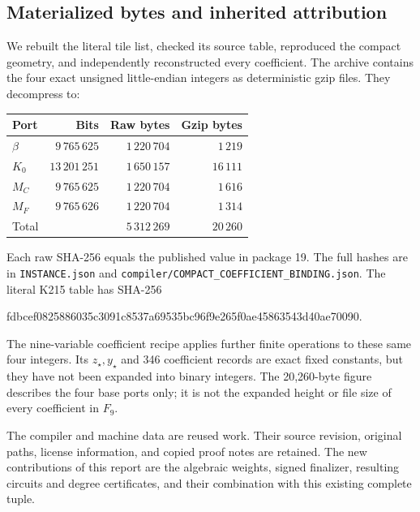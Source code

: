 \subsection{Materialized bytes and inherited attribution}
We rebuilt the literal tile list, checked its source table, reproduced the
compact geometry, and independently reconstructed every coefficient. The
archive contains the four exact unsigned little-endian integers as
deterministic gzip files. They decompress to:
\begin{center}
\begin{tabular}{lrrr}
\toprule
Port & Bits & Raw bytes & Gzip bytes\\
\midrule
$\beta$ & $9\,765\,625$ & $1\,220\,704$ & $1\,219$\\
$K_0$ & $13\,201\,251$ & $1\,650\,157$ & $16\,111$\\
$M_C$ & $9\,765\,625$ & $1\,220\,704$ & $1\,616$\\
$M_F$ & $9\,765\,626$ & $1\,220\,704$ & $1\,314$\\
\midrule
Total & & $5\,312\,269$ & $20\,260$\\
\bottomrule
\end{tabular}
\end{center}
Each raw SHA-256 equals the published value in package 19. The full hashes
are in \texttt{INSTANCE.json} and
\texttt{compiler/COMPACT\_COEFFICIENT\_BINDING.json}. The literal K215
table has SHA-256
\begin{center}\small\ttfamily
fdbcef0825886035c3091c8537a69535bc96f9e265f0ae45863543d40ae70090.
\end{center}
The nine-variable coefficient recipe applies further finite operations to
these same four integers. Its $z_\star,y_\star$ and 346 coefficient records
are exact fixed constants, but they have not been expanded into binary
integers. The 20,260-byte figure describes the four base ports only; it is
not the expanded height or file size of every coefficient in $F_9$.

The compiler and machine data are reused work. Their source revision,
original paths, license information, and copied proof notes are retained.
The new contributions of this report are the algebraic weights, signed
finalizer, resulting circuits and degree certificates, and their combination
with this existing complete tuple.
